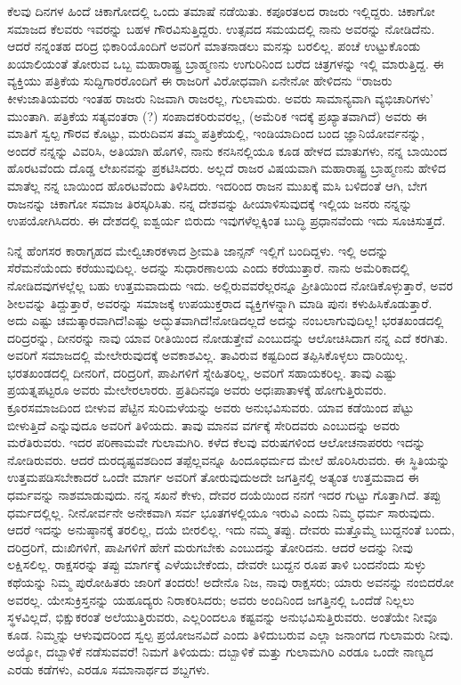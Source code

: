 ಕೆಲವು ದಿನಗಳ ಹಿಂದೆ ಚಿಕಾಗೋದಲ್ಲಿ ಒಂದು ತಮಾಷೆ ನಡೆಯಿತು. ಕಪೂರತಲದ ರಾಜರು ಇಲ್ಲಿದ್ದರು. ಚಿಕಾಗೋ ಸಮಾಜದ ಕೆಲವರು ಇವರನ್ನು ಬಹಳ ಗೌರವಿಸುತ್ತಿದ್ದರು. ಉತ್ಸವದ ಸಮಯದಲ್ಲಿ ನಾನು ಅವರನ್ನು ನೋಡಿದೆನು. ಆದರೆ ನನ್ನಂತಹ ದರಿದ್ರ ಭಿಕಾರಿಯೊಂದಿಗೆ ಅವರಿಗೆ ಮಾತನಾಡಲು ಮನಸ್ಸು ಬರಲಿಲ್ಲ. ಪಂಚೆ ಉಟ್ಟುಕೊಂಡು ಖಯಾಲಿಯಂತೆ ತೋರುವ ಒಬ್ಬ ಮಹಾರಾಷ್ಟ್ರ ಬ್ರಾಹ್ಮಣನು ಉಗುರಿನಿಂದ ಬರೆದ ಚಿತ್ರಗಳನ್ನು ಇಲ್ಲಿ ಮಾರುತ್ತಿದ್ದ. ಈ ವ್ಯಕ್ತಿಯು ಪತ್ರಿಕೆಯ ಸುದ್ದಿಗಾರರೊಂದಿಗೆ ಈ ರಾಜರಿಗೆ ವಿರೋಧವಾಗಿ ಏನೇನೋ ಹೇಳಿದನು \enginline{-} “ರಾಜರು ಕೀಳುಜಾತಿಯವರು ಇಂತಹ ರಾಜರು ನಿಜವಾಗಿ ರಾಜರಲ್ಲ, ಗುಲಾಮರು. ಅವರು ಸಾಮಾನ್ಯವಾಗಿ ವ್ಯಭಿಚಾರಿಗಳು' ಮುಂತಾಗಿ. ಪತ್ರಿಕೆಯ ಸತ್ಯವಂತರಾ (?) ಸಂಪಾದಕರಿರುವರಲ್ಲ, (ಅಮೆರಿಕ ಇದಕ್ಕೆ ಪ್ರಖ್ಯಾತವಾಗಿದೆ) ಅವರು ಈ ಮಾತಿಗೆ ಸ್ವಲ್ಪ ಗೌರವ ಕೊಟ್ಟು, ಮರುದಿವಸ ತಮ್ಮ ಪತ್ರಿಕೆಯಲ್ಲಿ, ಇಂಡಿಯಾದಿಂದ ಬಂದ ಜ್ಞಾನಿಯೋರ್ವನನ್ನು, ಅಂದರೆ ನನ್ನನ್ನು ವಿವರಿಸಿ, ಅತಿಯಾಗಿ ಹೊಗಳಿ, ನಾನು ಕನಸಿನಲ್ಲಿಯೂ ಕೂಡ ಹೇಳದ ಮಾತುಗಳು, ನನ್ನ ಬಾಯಿಂದ ಹೊರಟವೆಂದು ದೊಡ್ಡ ಲೇಖನವನ್ನು ಪ್ರಕಟಿಸಿದರು. ಅಲ್ಲದೆ ರಾಜರ ವಿಷಯವಾಗಿ ಮಹಾರಾಷ್ಟ್ರ ಬ್ರಾಹ್ಮಣನು ಹೇಳಿದ ಮಾತೆಲ್ಲ ನನ್ನ ಬಾಯಿಂದ ಹೊರಟವೆಂದು ತಿಳಿಸಿದರು. ಇದರಿಂದ ರಾಜನ ಮುಖಕ್ಕೆ ಮಸಿ ಬಳಿದಂತೆ ಆಗಿ, ಬೇಗ ರಾಜನನ್ನು ಚಿಕಾಗೋ ಸಮಾಜ ತಿರಸ್ಕರಿಸಿತು. ನನ್ನ ದೇಶವನ್ನು ಹೀಯಾಳಿಸುವುದಕ್ಕೆ ಇಲ್ಲಿಯ ಜನರು ನನ್ನನ್ನು ಉಪಯೋಗಿಸಿದರು. ಈ ದೇಶದಲ್ಲಿ ಐಶ್ವರ್ಯ ಬಿರುದು ಇವುಗಳೆಲ್ಲಕ್ಕಿಂತ ಬುದ್ಧಿ ಪ್ರಧಾನವೆಂದು ಇದು ಸೂಚಿಸುತ್ತದೆ.

ನಿನ್ನೆ ಹೆಂಗಸರ ಕಾರಾಗೃಹದ ಮೇಲ್ವಿಚಾರಕಳಾದ ಶ‍್ರೀಮತಿ ಜಾನ್ಸನ್ ಇಲ್ಲಿಗೆ ಬಂದಿದ್ದಳು. ಇಲ್ಲಿ ಅದನ್ನು ಸೆರೆಮನೆಯೆಂದು ಕರೆಯುವುದಿಲ್ಲ. ಅದನ್ನು ಸುಧಾರಣಾಲಯ  ಎಂದು ಕರೆಯುತ್ತಾರೆ. ನಾನು ಅಮೆರಿಕಾದಲ್ಲಿ ನೋಡಿದವುಗಳಲ್ಲೆಲ್ಲ ಬಹು ಉತ್ತಮವಾದುದು ಇದು. ಅಲ್ಲಿರುವವರೆಲ್ಲರನ್ನೂ ಪ್ರೀತಿಯಿಂದ ನೋಡಿಕೊಳ್ಳುತ್ತಾರೆ, ಅವರ ಶೀಲವನ್ನು ತಿದ್ದುತ್ತಾರೆ, ಅವರನ್ನು ಸಮಾಜಕ್ಕೆ ಉಪಯುಕ್ತರಾದ ವ್ಯಕ್ತಿಗಳನ್ನಾಗಿ ಮಾಡಿ ಪುನಃ ಕಳುಹಿಸಿಕೊಡುತ್ತಾರೆ. ಅದು ಎಷ್ಟು ಚಮತ್ಕಾರವಾಗಿದೆ!ಎಷ್ಟು ಅದ್ಭುತವಾಗಿದೆ!ನೋಡಿದಲ್ಲದೆ ಅದನ್ನು ನಂಬಲಾಗುವುದಿಲ್ಲ! ಭರತಖಂಡದಲ್ಲಿ ದರಿದ್ರರನ್ನು, ದೀನರನ್ನು ನಾವು ಯಾವ ರೀತಿಯಿಂದ ನೋಡುತ್ತೇವೆ ಎಂಬುದನ್ನು ಆಲೋಚಿಸಿದಾಗ ನನ್ನ ಎದೆ ಕರಗಿತು. ಅವರಿಗೆ ಸಮಾಜದಲ್ಲಿ ಮೇಲೇರುವುದಕ್ಕೆ ಅವಕಾಶವಿಲ್ಲ. ತಾವಿರುವ ಕಷ್ಟದಿಂದ ತಪ್ಪಿಸಿಕೊಳ್ಳಲು ದಾರಿಯಿಲ್ಲ. ಭರತಖಂಡದಲ್ಲಿ ದೀನರಿಗೆ, ದರಿದ್ರರಿಗೆ, ಪಾಪಿಗಳಿಗೆ ಸ್ನೇಹಿತರಿಲ್ಲ, ಅವರಿಗೆ ಸಹಾಯಕರಿಲ್ಲ. ತಾವು ಎಷ್ಟು ಪ್ರಯತ್ನಪಟ್ಟರೂ ಅವರು ಮೇಲೇರಲಾರರು. ಪ್ರತಿದಿನವೂ ಅವರು ಅಧಃಪಾತಾಳಕ್ಕೆ ಹೋಗುತ್ತಿರುವರು. ಕ್ರೂರಸಮಾಜದಿಂದ ಬೀಳುವ ಪೆಟ್ಟಿನ ಸುರಿಮಳೆಯನ್ನು ಅವರು ಅನುಭವಿಸುವರು. ಯಾವ ಕಡೆಯಿಂದ ಪೆಟ್ಟು ಬೀಳುತ್ತಿದೆ ಎನ್ನುವುದೂ ಅವರಿಗೆ ತಿಳಿಯದು. ತಾವು ಮಾನವ ವರ್ಗಕ್ಕೆ ಸೇರಿದವರು ಎಂಬುದನ್ನು ಅವರು ಮರೆತಿರುವರು. ಇದರ ಪರಿಣಾಮವೇ ಗುಲಾಮಗಿರಿ. ಕಳೆದ ಕೆಲವು ವರುಷಗಳಿಂದ ಆಲೋಚನಾಪರರು ಇದನ್ನು ನೋಡಿರುವರು. ಆದರೆ ದುರದೃಷ್ಟವಶದಿಂದ ತಪ್ಪೆಲ್ಲವನ್ನೂ ಹಿಂದೂಧರ್ಮದ ಮೇಲೆ ಹೊರಿಸಿರುವರು. ಈ ಸ್ಥಿತಿಯನ್ನು ಉತ್ತಮಪಡಿಸಬೇಕಾದರೆ ಒಂದೇ ಮಾರ್ಗ ಅವರಿಗೆ ತೋರುವುದು\enginline{-}ಅದೇ ಜಗತ್ತಿನಲ್ಲಿ ಅತ್ಯಂತ ಉತ್ತಮವಾದ ಈ ಧರ್ಮವನ್ನು ನಾಶಮಾಡುವುದು. ನನ್ನ ಸಖನೆ ಕೇಳು, ದೇವರ ದಯೆಯಿಂದ ನನಗೆ ಇದರ ಗುಟ್ಟು ಗೊತ್ತಾಗಿದೆ. ತಪ್ಪು ಧರ್ಮದಲ್ಲಿಲ್ಲ. ನೀನೋರ್ವನೇ ಅನೇಕವಾಗಿ ಸರ್ವ ಭೂತಗಳಲ್ಲಿಯೂ ಇರುವಿ ಎಂದು ನಿಮ್ಮ ಧರ್ಮ ಸಾರುವುದು. ಆದರೆ ಇದನ್ನು ಅನುಷ್ಠಾನಕ್ಕೆ ತರಲಿಲ್ಲ, ದಯೆ ಬೀರಲಿಲ್ಲ. ಇದು ನಮ್ಮ ತಪ್ಪು. ದೇವರು ಮತ್ತೊಮ್ಮೆ ಬುದ್ದನಂತೆ ಬಂದು, ದರಿದ್ರರಿಗೆ, ದುಃಖಿಗಳಿಗೆ, ಪಾಪಿಗಳಿಗೆ ಹೇಗೆ ಮರುಗಬೇಕು ಎಂಬುದನ್ನು ತೋರಿದನು. ಆದರೆ ಅದನ್ನು ನೀವು ಲಕ್ಷಿಸಲಿಲ್ಲ. ರಾಕ್ಷಸರನ್ನು ತಪ್ಪು ಮಾರ್ಗಕ್ಕೆ ಎಳೆಯಬೇಕೆಂದು, ದೇವರೇ ಬುದ್ದನ ರೂಪ ತಾಳಿ ಬಂದನೆಂದು ಸುಳ್ಳು ಕಥೆಯನ್ನು ನಿಮ್ಮ ಪುರೋಹಿತರು ಜಾರಿಗೆ ತಂದರು! ಅದೇನೊ ನಿಜ, ನಾವು ರಾಕ್ಷಸರು; ಯಾರು ಅವನನ್ನು ನಂಬಿದರೋ ಅವರಲ್ಲ. ಯೇಸುಕ್ರಿಸ್ತನನ್ನು ಯಹೂದ್ಯರು ನಿರಾಕರಿಸಿದರು; ಅವರು ಅಂದಿನಿಂದ ಜಗತ್ತಿನಲ್ಲಿ ಒಂದೆಡೆ ನಿಲ್ಲಲು ಸ್ಥಳವಿಲ್ಲದೆ, ಭಿಕ್ಷುಕರಂತೆ ಅಲೆಯುತ್ತಿರುವರು, ಎಲ್ಲರಿಂದಲೂ ಕಷ್ಟವನ್ನು ಅನುಭವಿಸುತ್ತಿರುವರು. ಅಂತೆಯೇ ನೀವೂ ಕೂಡ. ನಿಮ್ಮನ್ನು ಆಳುವುದರಿಂದ ಸ್ವಲ್ಪ ಪ್ರಯೋಜನವಿದೆ ಎಂದು ತಿಳಿದುಬರುವ ಎಲ್ಲಾ ಜನಾಂಗದ ಗುಲಾಮರು ನೀವು. ಅಯ್ಯೋ, ದಬ್ಬಾಳಿಕೆ ನಡೆಸುವವರೆ! ನಿಮಗೆ ತಿಳಿಯದು: ದಬ್ಬಾಳಿಕೆ ಮತ್ತು ಗುಲಾಮಗಿರಿ ಎರಡೂ ಒಂದೇ ನಾಣ್ಯದ ಎರಡು ಕಡೆಗಳು, ಎರಡೂ ಸಮಾನಾರ್ಥದ ಶಬ್ದಗಳು.

